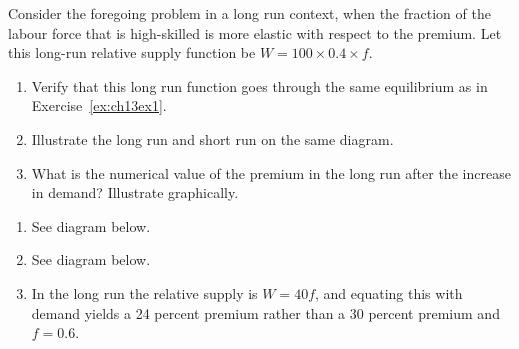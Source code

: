 \begin{enumialphparenastyle}
\begin{ex}\label{ex:ch13ex2}
Consider the foregoing problem in a long run context, when the fraction of the labour force that is high-skilled is more elastic with respect to the premium. Let this long-run relative supply function be $W=100\times 0.4\times f$.
\begin{enumerate}
	\item	Verify that this long run function goes through the same equilibrium as in Exercise~\ref{ex:ch13ex1}.
	\item	Illustrate the long run and short run on the same diagram. 
	\item	What is the numerical value of the premium in the long run after the increase in demand? Illustrate graphically.
\end{enumerate}
\begin{sol}
\begin{enumerate}
	\item	See diagram below.
	\item	See diagram below.
	\item	In the long run the relative supply is $W=40f$, and equating this with demand yields a 24 percent premium rather than a 30 percent premium and $f=0.6$.
\end{enumerate}
\begin{center}
\end{center}
\end{sol}
\end{ex}


\end{enumialphparenastyle}
